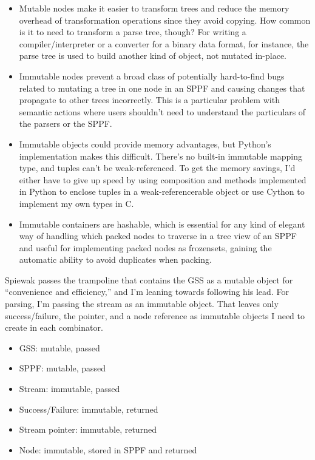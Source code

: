 \documentclass[12pt]{article}
\begin{document}
\begin{itemize}
\item Mutable nodes make it easier to transform trees and reduce the
  memory overhead of transformation operations since they avoid
  copying.  How common is it to need to transform a parse tree,
  though?  For writing a compiler/interpreter or a converter for a
  binary data format, for instance, the parse tree is used to build
  another kind of object, not mutated in-place.
\item Immutable nodes prevent a broad class of potentially
  hard-to-find bugs related to mutating a tree in one node in an SPPF
  and causing changes that propagate to other trees incorrectly.  This
  is a particular problem with semantic actions where users shouldn't
  need to understand the particulars of the parsers or the SPPF.
\item Immutable objects could provide memory advantages, but Python's
  implementation makes this difficult.  There's no built-in immutable
  mapping type, and tuples can't be weak-referenced.  To get the
  memory savings, I'd either have to give up speed by using
  composition and methods implemented in Python to enclose tuples in a
  weak-referencerable object or use Cython to implement my own types
  in C.
\item Immutable containers are hashable, which is essential for any
  kind of elegant way of handling which packed nodes to traverse in a
  tree view of an SPPF and useful for implementing packed nodes as
  frozensets, gaining the automatic ability to avoid duplicates when
  packing.
\end{itemize}

Spiewak passes the trampoline that contains the GSS as a mutable
object for ``convenience and efficiency,'' and I'm leaning towards
following his lead.  For parsing, I'm passing the stream as an
immutable object.  That leaves only success/failure, the pointer, and
a node reference as immutable objects I need to create in each combinator.

\begin{itemize}
\item GSS: mutable, passed
\item SPPF: mutable, passed
\item Stream: immutable, passed
\item Success/Failure: immutable, returned
\item Stream pointer: immutable, returned
\item Node: immutable, stored in SPPF and returned
\end{itemize}
\end{document}
